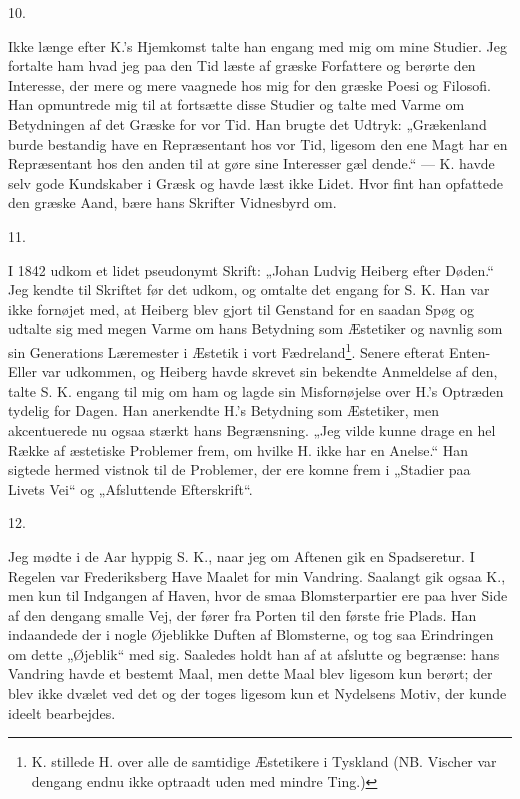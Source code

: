 \documentclass[12pt,a4paper,openany]{book}
\newcommand{\secnum}[1]{\par\begin{center}#1\end{center}\par\nobreak}
\newcommand{\opage}[1]{\marginnote{\footnotesize\textit{[#1]}}}
\begin{document}
\secnum{10.}

Ikke længe efter K.’s Hjemkomst talte han engang
med mig om mine Studier. Jeg fortalte ham hvad jeg
paa den Tid læste af græske Forfattere og berørte den
Interesse, der mere og mere vaagnede hos mig for den
græske Poesi og Filosofi. Han opmuntrede mig til at
fortsætte disse Studier og talte med Varme om Betydningen
af det Græske for vor Tid. Han brugte det Udtryk:
„Grækenland burde bestandig have en Repræsentant
hos vor Tid, ligesom den ene Magt har en Repræsentant
hos den anden til at gøre sine Interesser gæl%
\opage{346}dende.“ --- K. havde selv gode Kundskaber i Græsk og
havde læst ikke Lidet. Hvor fint han opfattede den
græske Aand, bære hans Skrifter Vidnesbyrd om.

\secnum{11.}

I 1842 udkom et lidet pseudonymt Skrift: „Johan
Ludvig Heiberg efter Døden.“ Jeg kendte til Skriftet
før det udkom, og omtalte det engang for S. K. Han
var ikke fornøjet med, at Heiberg blev gjort til Genstand
for en saadan Spøg og udtalte sig med megen
Varme om hans Betydning som Æstetiker og navnlig
som sin Generations Læremester i Æstetik i vort Fædreland\footnote{K. stillede H. over alle de samtidige Æstetikere i Tyskland (NB. Vischer var dengang endnu ikke optraadt uden med mindre Ting.)}. Senere efterat Enten-Eller var udkommen, og
Heiberg havde skrevet sin bekendte Anmeldelse af den,
talte S. K. engang til mig om ham og lagde sin Misfornøjelse
over H.’s Optræden tydelig for Dagen. Han
anerkendte H.’s Betydning som Æstetiker, men akcentuerede
nu ogsaa stærkt hans Begrænsning. „Jeg vilde
kunne drage en hel Række af æstetiske Problemer frem,
om hvilke H. ikke har en Anelse.“ Han sigtede hermed
vistnok til de Problemer, der ere komne frem i „Stadier
paa Livets Vei“ og „Afsluttende Efterskrift“.

\secnum{12.}

Jeg mødte i de Aar hyppig S. K., naar jeg om Aftenen
gik en Spadseretur. I Regelen var Frederiksberg
Have Maalet for min Vandring. Saalangt gik ogsaa K.,
men kun til Indgangen af Haven, hvor de smaa Blomsterpartier
ere paa hver Side af den dengang smalle Vej,
der fører fra Porten til den første frie Plads. Han indaandede
der i nogle Øjeblikke Duften af Blomsterne, og
\opage{347}tog saa Erindringen om dette „Øjeblik“ med sig. Saaledes
holdt han af at afslutte og begrænse: hans Vandring havde et
bestemt Maal, men dette Maal blev ligesom kun berørt; der blev
ikke dvælet ved det og der toges ligesom kun et Nydelsens Motiv,
der kunde ideelt bearbejdes.
\end{document}
